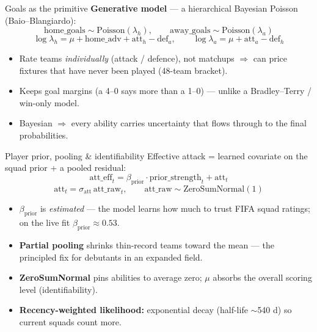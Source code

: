 \documentclass[aspectratio=169]{beamer}
\begin{document}
\begin{frame}{Goals as the primitive}
\textbf{Generative model} --- a hierarchical Bayesian Poisson (Baio--Blangiardo):
\[
\text{home\_goals} \sim \text{Poisson}(\lambda_h),\qquad
\text{away\_goals} \sim \text{Poisson}(\lambda_a)
\]
\[
\log\lambda_h = \mu + \text{home\_adv} + \text{att}_h - \text{def}_a,\qquad
\log\lambda_a = \mu + \text{att}_a - \text{def}_h
\]
\footnotesize
\begin{itemize}\footnotesize
  \item Rate teams \emph{individually} (attack / defence), not matchups $\Rightarrow$
        can price fixtures that have never been played (48-team bracket).
  \item Keeps goal margins (a 4--0 says more than a 1--0) --- unlike a
        Bradley--Terry / win-only model.
  \item Bayesian $\Rightarrow$ every ability carries uncertainty that flows
        through to the final probabilities.
\end{itemize}
\end{frame}

\begin{frame}{Player prior, pooling \& identifiability}
Effective attack = learned covariate on the squad prior + a pooled residual:
\[
\text{att\_eff}_t = \beta_{\text{prior}}\cdot \text{prior\_strength}_t + \text{att}_t
\]
\[
\text{att}_t = \sigma_{\text{att}}\,\text{att\_raw}_t,\qquad
\text{att\_raw} \sim \text{ZeroSumNormal}(1)
\]
\begin{itemize}\footnotesize
  \item $\beta_{\text{prior}}$ is \emph{estimated} --- the model learns how much
        to trust FIFA squad ratings; on the live fit $\beta_{\text{prior}}\approx 0.53$.
  \item \textbf{Partial pooling} shrinks thin-record teams toward the mean ---
        the principled fix for debutants in an expanded field.
  \item \textbf{ZeroSumNormal} pins abilities to average zero; $\mu$ absorbs the
        overall scoring level (identifiability).
  \item \textbf{Recency-weighted likelihood:} exponential decay (half-life
        $\sim$540 d) so current squads count more.
\end{itemize}
\end{frame}
\end{document}
